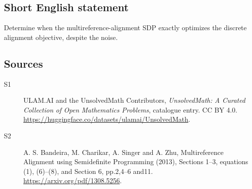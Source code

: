 \documentclass[11pt]{article}
\begin{document}
\subsection{Short English statement}
Determine when the multireference-alignment SDP exactly optimizes the discrete alignment objective, despite the noise.
\subsection{Sources}
\begin{description}
\item[\hypertarget{source:statement:1}{S1}] ULAM.AI and the UnsolvedMath Contributors, \emph{UnsolvedMath: A Curated Collection of Open Mathematics Problems}, catalogue entry. CC BY 4.0. \url{https://huggingface.co/datasets/ulamai/UnsolvedMath}.
\item[\hypertarget{source:statement:2}{S2}] A. S. Bandeira, M. Charikar, A. Singer and A. Zhu, Multireference Alignment using Semidefinite Programming (2013), Sections 1--3, equations (1), (6)--(8), and Section 6, pp.2,4--6 and11. \url{https://arxiv.org/pdf/1308.5256}.
\end{description}
\label{end:statement}
\end{document}
